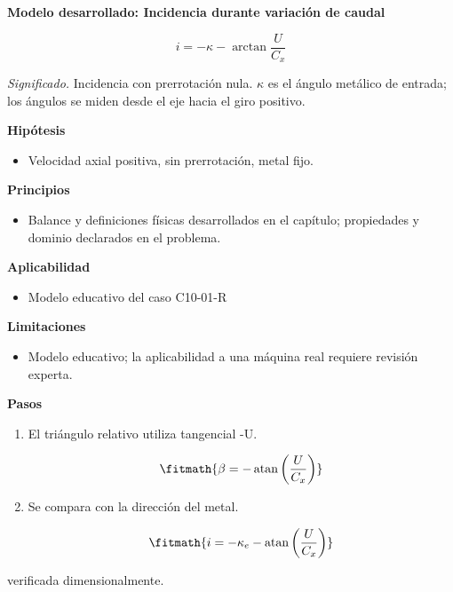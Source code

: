 \documentclass[10pt,openany]{book}
\begin{document}
\begin{tcolorbox}[title={Desarrollos del modelo}, studiumdef, breakable]

\noindent\textbf{Modelo desarrollado: Incidencia durante variación de caudal}

\begin{equation}
i=-\kappa-\arctan\frac{U}{C_x}
\label{eq:EC-C10}
\end{equation}

\noindent\textit{Significado.} Incidencia con prerrotación nula. $\kappa$ es el ángulo metálico de entrada; los ángulos se miden desde el eje hacia el giro positivo.

\noindent\textbf{Hipótesis}
\begin{itemize}
\item Velocidad axial positiva, sin prerrotación, metal fijo.
\end{itemize}

\noindent\textbf{Principios}
\begin{itemize}
\item Balance y definiciones físicas desarrollados en el capítulo; propiedades y dominio declarados en el problema.
\end{itemize}

\noindent\textbf{Aplicabilidad}
\begin{itemize}
\item Modelo educativo del caso C10-01-R
\end{itemize}

\noindent\textbf{Limitaciones}
\begin{itemize}
\item Modelo educativo; la aplicabilidad a una máquina real requiere revisión experta.
\end{itemize}

\noindent\textbf{Pasos}
\begin{enumerate}
\item
El triángulo relativo utiliza tangencial -U.

\[
\fitmath{\beta=- \operatorname{atan}{\left(\frac{U}{C_x} \right)}}
\]
\item
Se compara con la dirección del metal.

\[
\fitmath{i=- \kappa_e - \operatorname{atan}{\left(\frac{U}{C_x} \right)}}
\]
\end{enumerate}

{\noindent\footnotesize verificada dimensionalmente.\par}
\end{tcolorbox}
\end{document}
